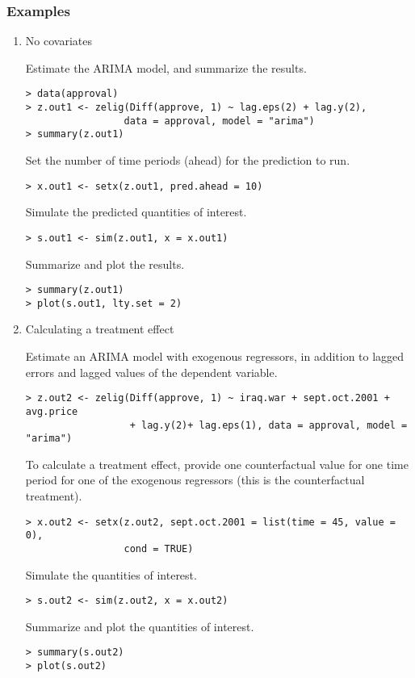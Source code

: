 \subsubsection*{Examples}


\begin{enumerate}

\item No covariates\newline

Estimate the ARIMA model, and summarize the results.
\begin{verbatim}
> data(approval)
> z.out1 <- zelig(Diff(approve, 1) ~ lag.eps(2) + lag.y(2), 
                 data = approval, model = "arima")
> summary(z.out1)
\end{verbatim}
Set the number of time periods (ahead) for the prediction to run.
\begin{verbatim}
> x.out1 <- setx(z.out1, pred.ahead = 10)
\end{verbatim}
Simulate the predicted quantities of interest.
\begin{verbatim}
> s.out1 <- sim(z.out1, x = x.out1)
\end{verbatim}
Summarize and plot the results.
\begin{verbatim}
> summary(z.out1)
> plot(s.out1, lty.set = 2)
\end{verbatim}

\item Calculating a treatment effect\newline

Estimate an ARIMA model with exogenous regressors, in addition to
lagged errors and lagged values of the dependent variable.
\begin{verbatim}
> z.out2 <- zelig(Diff(approve, 1) ~ iraq.war + sept.oct.2001 + avg.price
                  + lag.y(2)+ lag.eps(1), data = approval, model = "arima")
\end{verbatim}
To calculate a treatment effect, provide one counterfactual value for
one time period for one of the exogenous regressors (this is the
counterfactual treatment). 
\begin{verbatim}
> x.out2 <- setx(z.out2, sept.oct.2001 = list(time = 45, value = 0), 
                 cond = TRUE)
\end{verbatim}
Simulate the quantities of interest.
\begin{verbatim}
> s.out2 <- sim(z.out2, x = x.out2) 
\end{verbatim}
Summarize and plot the quantities of interest.
\begin{verbatim}
> summary(s.out2)
> plot(s.out2)
\end{verbatim}


\end{enumerate}
